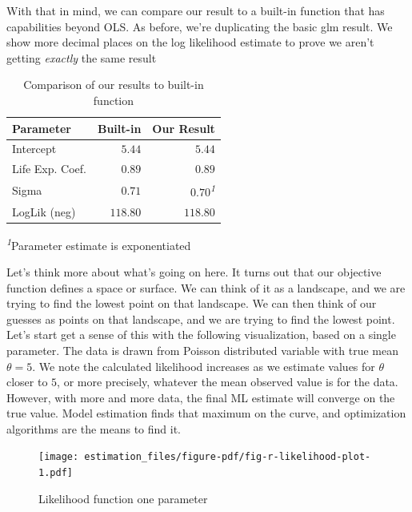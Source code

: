 \documentclass[
  letterpaper,
]{krantz}
\begin{document}
With that in mind, we can compare our result to a built-in function that
has capabilities beyond OLS. As before, we're duplicating the basic glm
result. We show more decimal places on the log likelihood estimate to
prove we aren't getting \emph{exactly} the same result

\hypertarget{tbl-r-likelihood}{}
\setlength{\LTpost}{0mm}
\begin{longtable}{lrr}
\caption{\label{tbl-r-likelihood}Comparison of our results to built-in function }\tabularnewline

\toprule
Parameter & Built-in & Our Result \\ 
\midrule\addlinespace[2.5pt]
Intercept & \textcolor[HTML]{404040}{$5.44$} & \textcolor[HTML]{404040}{$5.44$} \\ 
Life Exp. Coef. & \textcolor[HTML]{404040}{$0.89$} & \textcolor[HTML]{404040}{$0.89$} \\ 
Sigma & \textcolor[HTML]{404040}{$0.71$} & \textcolor[HTML]{404040}{$0.70$\textsuperscript{\textit{1}}} \\ 
LogLik (neg) & \textcolor[HTML]{404040}{$118.80$} & \textcolor[HTML]{404040}{$118.80$} \\ 
\bottomrule
\end{longtable}
\begin{minipage}{\linewidth}
\textsuperscript{\textit{1}}Parameter estimate is exponentiated\\
\end{minipage}

Let's think more about what's going on here. It turns out that our
objective function defines a space or surface. We can think of it as a
landscape, and we are trying to find the lowest point on that landscape.
We can then think of our guesses as points on that landscape, and we are
trying to find the lowest point. Let's start get a sense of this with
the following visualization, based on a single parameter. The data is
drawn from Poisson distributed variable with true mean \(\theta=5\). We
note the calculated likelihood increases as we estimate values for
\(\theta\) closer to \(5\), or more precisely, whatever the mean
observed value is for the data. However, with more and more data, the
final ML estimate will converge on the true value. Model estimation
finds that maximum on the curve, and optimization algorithms are the
means to find it.

\begin{figure}

{\centering \texttt{[image: estimation\_files/figure-pdf/fig-r-likelihood-plot-1.pdf]}

}

\caption{\label{fig-r-likelihood-plot}Likelihood function one parameter}

\end{figure}
\end{document}
